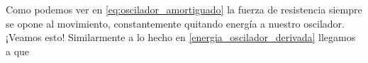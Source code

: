 \documentclass[a4paper,spanish]{article}
\providecommand{\vmed}[1]{\langle#1\rangle}
\numberwithin{equation}{section}
\begin{document}







Como podemos ver en \ref{eq:oscilador_amortiguado} la fuerza de resistencia siempre se opone al movimiento, constantemente quitando energ\'ia a nuestro oscilador. ¡Veamos esto! Similarmente a lo hecho en \ref{energia_oscilador_derivada} llegamos a que 
\end{document}

